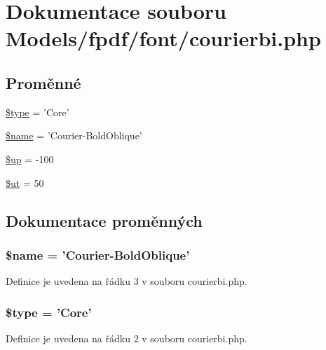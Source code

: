 \hypertarget{courierbi_8php}{\section{Dokumentace souboru Models/fpdf/font/courierbi.php}
\label{courierbi_8php}
}
\subsection*{Proměnné}
\begin{DoxyCompactItemize}
\item 
\hyperlink{courierbi_8php_a9a4a6fba2208984cabb3afacadf33919}{\$type} = 'Core'
\item 
\hyperlink{courierbi_8php_ab2fc40d43824ea3e1ce5d86dee0d763b}{\$name} = 'Courier-\/Bold\-Oblique'
\item 
\hyperlink{courierbi_8php_a6b5ad2ac55f9df46e8f34e78fbd6f176}{\$up} = -\/100
\item 
\hyperlink{courierbi_8php_aadd3f841051043ee58e587e840e8dd0b}{\$ut} = 50
\end{DoxyCompactItemize}


\subsection{Dokumentace proměnných}
\hypertarget{courierbi_8php_ab2fc40d43824ea3e1ce5d86dee0d763b}{
\subsubsection[{\$name}]{\setlength{\rightskip}{0pt plus 5cm}\$name = 'Courier-\/Bold\-Oblique'}}\label{courierbi_8php_ab2fc40d43824ea3e1ce5d86dee0d763b}


Definice je uvedena na řádku 3 v souboru courierbi.\-php.

\hypertarget{courierbi_8php_a9a4a6fba2208984cabb3afacadf33919}{
\subsubsection[{\$type}]{\setlength{\rightskip}{0pt plus 5cm}\$type = 'Core'}}\label{courierbi_8php_a9a4a6fba2208984cabb3afacadf33919}


Definice je uvedena na řádku 2 v souboru courierbi.\-php.

